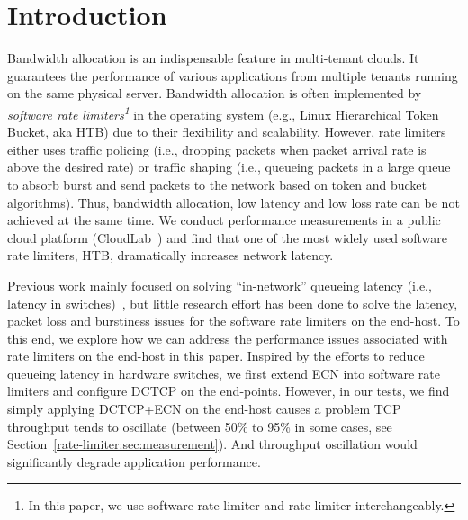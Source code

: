 \section{Introduction}
\label{rate-limiter:sec:introduction}

Bandwidth allocation is an indispensable feature in multi-tenant clouds. 
It guarantees the performance of various applications from multiple tenants running on the same physical server. 
Bandwidth allocation is often implemented by \textit{software rate limiters\footnote{In this paper,
we use software rate limiter and rate limiter interchangeably.}} 
in the operating system (e.g., Linux Hierarchical Token Bucket, aka HTB) due to their flexibility and scalability.
However, rate limiters either uses traffic policing (i.e., dropping packets when
packet arrival rate is above the desired rate) or traffic shaping (i.e., queueing packets in a large
queue to absorb burst and send packets to the network based on token and bucket algorithms).
Thus, bandwidth allocation, low latency and low loss rate can be not achieved at the same time. 
We conduct performance measurements in a public cloud platform (CloudLab~\cite{cloudlab}) and 
find that one of the most widely used software rate limiters, HTB, dramatically increases network latency.

Previous work mainly focused on solving ``in-network'' queueing latency (i.e., latency in 
switches)~\cite{alizadeh2010data,he2016ac,mittal2015timely}, but little research effort has been
done to solve the latency, packet loss and burstiness issues for the software rate limiters on the end-host.
To this end, we explore how we can address the performance issues associated with rate limiters on the end-host in this paper.
Inspired by the efforts to reduce queueing latency in hardware switches, 
we first extend ECN into software rate limiters and configure DCTCP on the end-points. 
However, in our tests, we find simply applying DCTCP+ECN on the end-host causes a problem \textemdash\xspace 
TCP throughput tends to oscillate (between 50\% to 95\% in some cases, see Section~\ref{rate-limiter:sec:measurement}). 
And throughput oscillation would significantly degrade application performance. 

